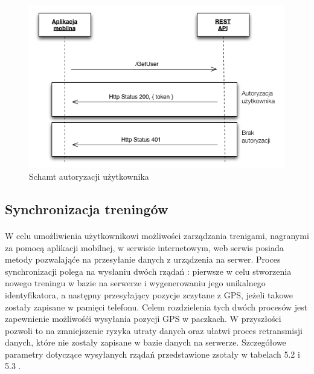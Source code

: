 \begin{figure}[ht]
	\centering
		\includegraphics[width=1\linewidth]{assets/auth_schema.png}
		\caption{Schamt autoryzacji użytkownika}
	\label{fig:auth_schema}
\end{figure}

\newpage

\subsection{Synchronizacja treningów} %
\label{sub:synchronizacja_trening_w}
\paragraph{} %
\label{par:}
W celu umożliwienia użytkownikowi możliwości zarządzania trenigami, nagranymi za pomocą aplikacji mobilnej, w serwisie internetowym, web serwis posiada metody pozwalająće na przesyłanie danych z urządzenia na serwer. Proces synchronizacji polega na wysłaniu dwóch rządań : pierwsze w celu stworzenia nowego treningu w bazie na serwerze i wygenerowaniu jego unikalnego identyfikatora, a następny przesyłający pozycje zczytane z GPS, jeżeli takowe zostały zapisane w pamięci telefonu. Celem rozdzielenia tych dwóch procesów jest zapewnienie możliwośći wysyłania pozycji GPS w paczkach. W przyszłości pozwoli to na zmniejszenie ryzyka utraty danych oraz ułatwi proces retransmisji danych, które nie zostały zapisane w bazie danych na serwerze. Szczegółowe parametry dotyczące wysyłanych rządań przedstawione zsotały w tabelach 5.2 i 5.3 .

